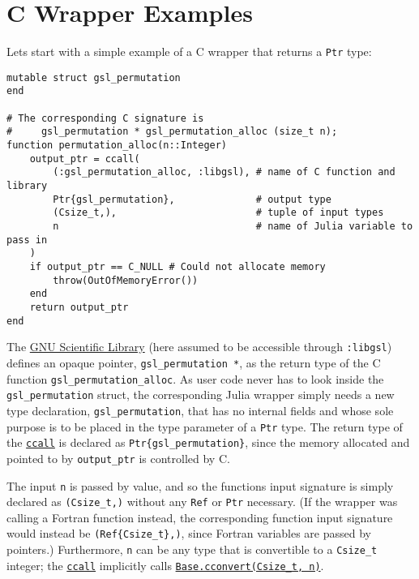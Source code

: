 \hypertarget{16047542394965419966}{}


\section{C Wrapper Examples}



Let{\textquotesingle}s start with a simple example of a C wrapper that returns a \texttt{Ptr} type:




\begin{verbatim}
mutable struct gsl_permutation
end

# The corresponding C signature is
#     gsl_permutation * gsl_permutation_alloc (size_t n);
function permutation_alloc(n::Integer)
    output_ptr = ccall(
        (:gsl_permutation_alloc, :libgsl), # name of C function and library
        Ptr{gsl_permutation},              # output type
        (Csize_t,),                        # tuple of input types
        n                                  # name of Julia variable to pass in
    )
    if output_ptr == C_NULL # Could not allocate memory
        throw(OutOfMemoryError())
    end
    return output_ptr
end
\end{verbatim}



The \href{https://www.gnu.org/software/gsl/}{GNU Scientific Library} (here assumed to be accessible through \texttt{:libgsl}) defines an opaque pointer, \texttt{gsl\_permutation *}, as the return type of the C function \texttt{gsl\_permutation\_alloc}. As user code never has to look inside the \texttt{gsl\_permutation} struct, the corresponding Julia wrapper simply needs a new type declaration, \texttt{gsl\_permutation}, that has no internal fields and whose sole purpose is to be placed in the type parameter of a \texttt{Ptr} type.  The return type of the \hyperlink{14245046751182637566}{\texttt{ccall}} is declared as \texttt{Ptr\{gsl\_permutation\}}, since the memory allocated and pointed to by \texttt{output\_ptr} is controlled by C.



The input \texttt{n} is passed by value, and so the function{\textquotesingle}s input signature is simply declared as \texttt{(Csize\_t,)} without any \texttt{Ref} or \texttt{Ptr} necessary. (If the wrapper was calling a Fortran function instead, the corresponding function input signature would instead be \texttt{(Ref\{Csize\_t\},)}, since Fortran variables are passed by pointers.) Furthermore, \texttt{n} can be any type that is convertible to a \texttt{Csize\_t} integer; the \hyperlink{14245046751182637566}{\texttt{ccall}} implicitly calls \hyperlink{16487788729383051927}{\texttt{Base.cconvert(Csize\_t, n)}}.



